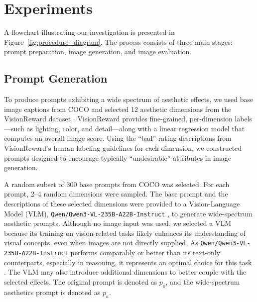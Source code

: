\section{Experiments}

A flowchart illustrating our investigation is presented in Figure~\ref{fig:procedure_diagram}. The process consists of three main stages: prompt preparation, image generation, and image evaluation.

\subsection{Prompt Generation}

To produce prompts exhibiting a wide spectrum of aesthetic effects, we used base image captions from COCO \cite{chen_microsoft_2015} and selected 12 aesthetic dimensions from the VisionReward dataset \cite{xu_visionreward_2025}. VisionReward provides fine-grained, per-dimension labels—such as lighting, color, and detail—along with a linear regression model that computes an overall image score. Using the ``bad'' rating descriptions from VisionReward’s human labeling guidelines for each dimension, we constructed prompts designed to encourage typically ``undesirable'' attributes in image generation.



A random subset of 300 base prompts from COCO was selected. For each prompt, 2--4 random dimensions were sampled. The base prompt and the descriptions of these selected dimensions were provided to a Vision-Language Model (VLM), \texttt{Qwen/Qwen3-VL-235B-A22B-Instruct} \cite{qwen3-vl}, to generate wide-spectrum aesthetic prompts. Although no image input was used, we selected a VLM because its training on vision-related tasks likely enhances its understanding of visual concepts, even when images are not directly supplied. As \texttt{Qwen/Qwen3-VL-235B-A22B-Instruct} performs comparably or better than its text-only counterparts, especially in reasoning, it represents an optimal choice for this task \cite{qwen3-vl}. The VLM may also introduce additional dimensions to better couple with the selected effects. The original prompt is denoted as $p_o$, and the wide-spectrum aesthetics prompt is denoted as $p_a$.


